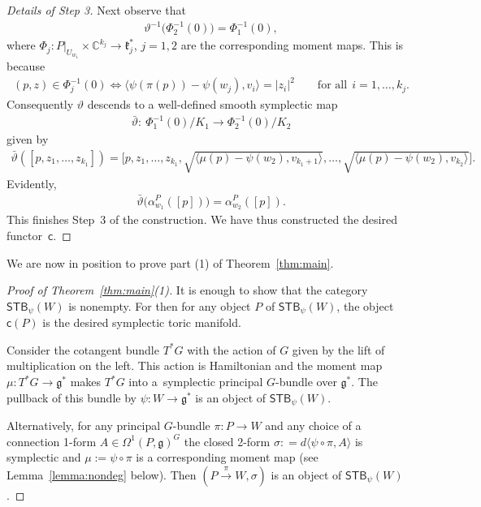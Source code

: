 \documentclass[10pt,a4paper]{amsart}
\numberwithin{equation}{section}
\begin{document}
\begin{proof}[Details of Step 3]
Next observe that
\begin{gather*}
\vartheta^{-1} \big(\Phi_2 ^{-1} (0)\big) = \Phi_1 ^{-1} (0),
\end{gather*}
where $\Phi_j\colon P|_{U_{w_1}}\times {\mathbb C}^{k_j}\to {\mathfrak k}_j^*$, $j=1,2$ are
the corresponding moment maps.  This is because
\begin{gather*}
(p,z)\in \Phi_j^{-1} (0)\Leftrightarrow
\langle \psi(\pi(p)) - \psi(w_j), v_i\rangle = |z_i|^2
\qquad\textrm{for all} \ \ i=1,\ldots, k_j .
\end{gather*}
Consequently $\vartheta$ descends to a well-def\/ined smooth symplectic map
\begin{gather*}
\bar{\vartheta}\colon \  \Phi_1^{-1} (0)/K_1 \to \Phi_2 ^{-1} (0)/K_2
\end{gather*}
given by
\begin{gather*}
\bar{\vartheta}([p, z_1,\ldots,z_{k_1}]) = \Big[p, z_1,\ldots,z_{k_1},
\sqrt{\langle   \mu(p) - \psi(w_2),v_{k_1+1} \rangle},\ldots ,
\sqrt{\langle \mu(p) -  \psi(w_2),v_{k_2} \rangle }\Big].
\end{gather*}
Evidently,
\begin{gather*}
\bar{\vartheta} \big(\alpha^P_{w_1}([p])\big) = \alpha^P_{w_2}([p]).
\end{gather*}
This f\/inishes Step~3 of the construction.  We have thus constructed
the desired functor~${\textsf{c}}$.
\end{proof}

We are now in position to prove part (1) of Theorem~\ref{thm:main}.


\begin{proof}[Proof of Theorem~\ref{thm:main}(1)]
  It is enough to show that the category ${\textsf{STB}}_\psi (W)$ is nonempty.
  For then for any object $P$ of ${\textsf{STB}}_\psi (W)$, the object ${\textsf{c}} (P)$
  is the desired symplectic toric manifold.

  Consider the cotangent bundle $T^*G$ with the action of $G$ given by
  the lift of multiplication on the left.  This action is Hamiltonian
  and the moment map $\mu\colon T^*G\to {\mathfrak g}^*$ makes $T^*G$ into a~symplectic principal $G$-bundle over ${\mathfrak g}^*$.  The pullback of this
  bundle by $\psi\colon W\to {\mathfrak g}^*$ is an object of ${\textsf{STB}}_\psi (W)$.

  Alternatively, for any principal $G$-bundle $\pi\colon P\to W$ and any
  choice of a connection 1-form $A\in \Omega^1(P,{\mathfrak g})^G$ the closed
  2-form $\sigma: = d\langle \psi \circ \pi ,A\rangle$ is symplectic
  and $\mu:= \psi \circ \pi$ is a corresponding moment map (see
  Lemma~\ref{lemma:nondeg} below). Then $(P\xrightarrow{\pi} W,
  \sigma)$ is an object of ${\textsf{STB}}_\psi (W)$.
\end{proof}
\end{document}
